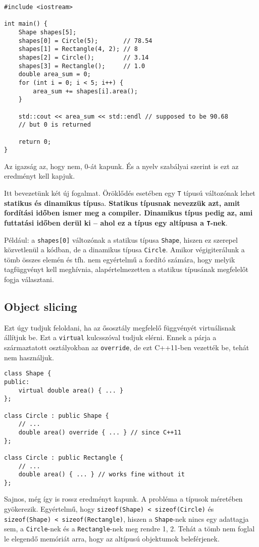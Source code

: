 \documentclass[a4paper, 11pt, oneside]{book}
\begin{document}
\begin{lstlisting}[style=cppstyle]
#include <iostream>
	
int main() {
	Shape shapes[5]; 
	shapes[0] = Circle(5);		 // 78.54
	shapes[1] = Rectangle(4, 2); // 8
	shapes[2] = Circle();    	 // 3.14
	shapes[3] = Rectangle(); 	 // 1.0
	double area_sum = 0;	
	for (int i = 0; i < 5; i++) {
		area_sum += shapes[i].area();
	}
		
	std::cout << area_sum << std::endl // supposed to be 90.68
	// but 0 is returned
	
	return 0;
}
\end{lstlisting}

Az igazság az, hogy nem, 0-át kapunk. És a nyelv szabályai szerint is ezt az eredményt kell kapjuk.

Itt bevezetünk két új fogalmat. Öröklődés esetében egy \verb*|T| típusú változónak lehet \textbf{statikus és dinamikus típus}a. \textbf{Statikus típusnak nevezzük azt, amit fordítási időben ismer meg a compiler. Dinamikus típus pedig az, ami futtatási időben derül ki -- ahol ez a típus egy altípusa a \texttt{T}-nek}.

Például: a \verb*|shapes[0]| változónak a statikus típusa \verb*|Shape|, hiszen ez szerepel közvetlenül a kódban, de a dinamikus típusa \verb*|Circle|. Amikor végigiterálunk a tömb összes elemén és tfh. nem egyértelmű a fordító számára, hogy melyik tagfüggvényt kell meghívnia, alapértelmezetten a statikus típusának megfelelőt fogja választani.

\subsection{Object slicing}

Ezt úgy tudjuk feloldani, ha az ősosztály megfelelő függvényét virtuálisnak állítjuk be. Ezt a \verb*|virtual| kulcsszóval tudjuk elérni. Ennek a párja a származtatott osztályokban az \verb*|override|, de ezt C++11-ben vezették be, tehát nem használjuk.

\begin{lstlisting}[style=cppstyle]
class Shape {
public:
	virtual double area() { ... }
};

class Circle : public Shape {
	// ...
	double area() override { ... } // since C++11
};

class Circle : public Rectangle {
	// ...
	double area() { ... } // works fine without it
};
\end{lstlisting}

Sajnos, még így is rossz eredményt kapunk. A probléma a típusok méretében gyökerezik. Egyértelmű, hogy \texttt{sizeof(Shape) < sizeof(Circle)} és \texttt{sizeof(Shape) < sizeof(Rectangle)}, hiszen a \texttt{Shape}-nek nincs egy adattagja sem, a \texttt{Circle}-nek és a \texttt{Rectangle}-nek meg rendre 1, 2. Tehát a tömb nem foglal le elegendő memóriát arra, hogy az altípusú objektumok beleférjenek. 
\end{document}
